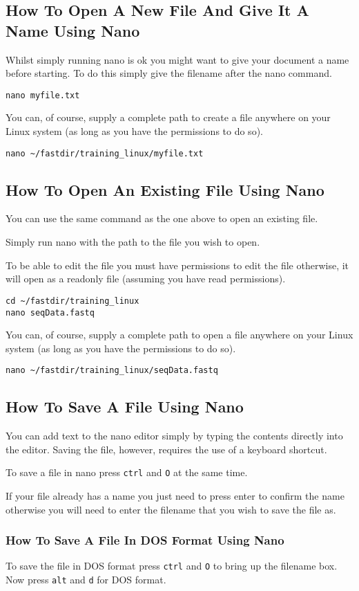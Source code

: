 \subsection{How To Open A New File And Give It A Name Using Nano}
Whilst simply running nano is ok you might want to give your document a name before starting. To do
this simply give the filename after the nano command.
\begin{lstlisting}
nano myfile.txt
\end{lstlisting}

You can, of course, supply a complete path to create a file anywhere on your Linux system (as long
as you have the permissions to do so).
\begin{lstlisting}
nano ~/fastdir/training_linux/myfile.txt
\end{lstlisting}

\subsection{How To Open An Existing File Using Nano}

You can use the same command as the one above to open an existing file.

Simply run nano with the path to the file you wish to open.

To be able to edit the file you must have permissions to edit the file otherwise, it will open as a
readonly file (assuming you have read permissions).

\begin{lstlisting}
cd ~/fastdir/training_linux
nano seqData.fastq
\end{lstlisting}

You can, of course, supply a complete path to open a file anywhere on your Linux system (as long as
you have the permissions to do so).
\begin{lstlisting}
nano ~/fastdir/training_linux/seqData.fastq
\end{lstlisting}

\subsection{How To Save A File Using Nano}
You can add text to the nano editor simply by typing the contents directly into the editor. Saving the file, however, requires the use of a keyboard shortcut.

To save a file in nano press \texttt{ctrl} and \texttt{O} at the same time.

If your file already has a name you just need to press enter to confirm the name otherwise you will need to enter the filename that you wish to save the file as.

\subsubsection{How To Save A File In DOS Format Using Nano}
To save the file in DOS format press \texttt{ctrl}  and \texttt{O} to bring up the filename box. Now press \texttt{alt} and \texttt{d} for DOS format.
